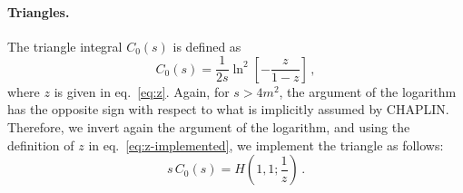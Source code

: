 \documentclass[12pt]{article}
\begin{document}
 
\paragraph{Triangles.} The triangle integral $C_0(s)$ is defined as
\begin{equation}
  \label{eq:triangle}
  C_0(s) = \frac{1}{2s}\ln^2\left[-\frac{z}{1-z}\right]\,,
\end{equation}
where $z$ is given in eq.~\eqref{eq:z}. Again, for $s>4m^2$, the argument of the logarithm has the opposite sign with respect to what is implicitly assumed by CHAPLIN. Therefore, we invert again the argument of the logarithm, and using the definition of $z$ in eq.~\eqref{eq:z-implemented}, we implement the triangle as follows:
\begin{equation}
  \label{eq:triangle-HPL}
  s\,C_0(s) = H\left(1,1;\frac{1}{z}\right)\,.
\end{equation}
\end{document}
